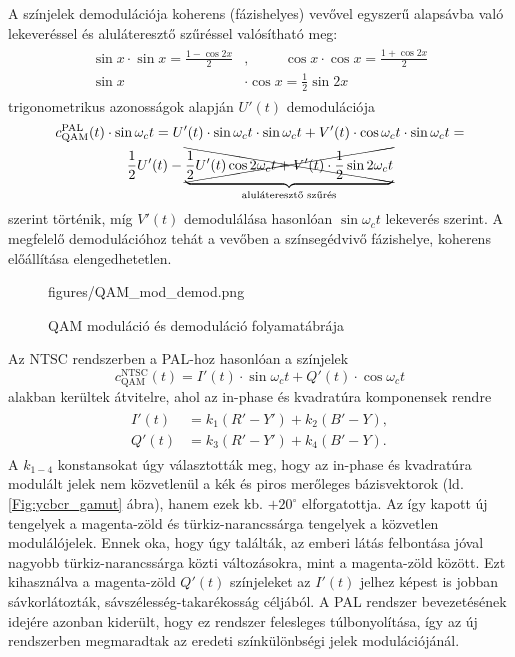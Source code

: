 A színjelek demodulációja koherens (fázishelyes) vevővel egyszerű alapsávba való lekeveréssel és aluláteresztő szűréssel valósítható meg:
\begin{align}
\begin{split}
\sin x \cdot \sin x = \frac{1-\cos 2x}{2}&,\hspace{1cm}
\cos x \cdot \cos x = \frac{1+\cos 2x}{2} \\
\sin x &\cdot \cos x = \frac{1}{2}\sin 2x
\end{split}
\end{align}
trigonometrikus azonosságok alapján $U'(t)$ demodulációja
\begin{multline}
c^{\mathrm{PAL}}_{\mathrm{QAM}}(t)\cdot \sin \omega_c t = U'(t)\cdot \sin \omega_c t\cdot \sin \omega_c t + V'(t) \cdot \cos \omega_c t  \cdot	\sin \omega_c t = \\
\frac{1}{2} U'(t) -
\underbrace{ \xcancel{ \frac{1}{2} U'(t)\cos 2 \omega_c t  + V'(t) \cdot \frac{1}{2}\sin 2 \omega_c t }}_{\text{aluláteresztő szűrés}}
\end{multline}
szerint történik, míg $V'(t)$ demodulálása hasonlóan $\sin \omega_c t$ lekeverés szerint.
A megfelelő demodulációhoz tehát a vevőben a színsegédvivő fázishelye, koherens előállítása elengedhetetlen.
\begin{figure}[]
	\centering
	\hspace{4mm}
	\begin{overpic}[width = 0.70\columnwidth ]{figures/QAM_mod_demod.png}
	\end{overpic}
	\caption{QAM moduláció és demoduláció folyamatábrája}
	\label{Fig:QAM_mod_demod}
\end{figure}

Az NTSC rendszerben a PAL-hoz hasonlóan a színjelek
\begin{equation}
c^{\mathrm{NTSC}}_{\mathrm{QAM}}(t) = I'(t) \cdot \sin \omega_c t + Q'(t) \cdot \cos \omega_c t
\end{equation}
alakban kerültek átvitelre, ahol az in-phase és kvadratúra komponensek rendre
\begin{align}
\begin{split}
I'(t) &= k_1 (R'-Y') + k_2 (B'-Y) ,\\ 
Q'(t) &= k_3 (R'-Y') + k_4 (B'-Y).
\end{split}
\end{align}
A $k_{1-4}$ konstansokat úgy választották meg, hogy az in-phase és kvadratúra modulált jelek nem közvetlenül a kék és piros merőleges bázisvektorok (ld. \ref{Fig:ycbcr_gamut} ábra), hanem ezek kb. $+20^{\circ}$ elforgatottja.
Az így kapott új tengelyek a magenta-zöld és türkiz-narancssárga tengelyek a közvetlen modulálójelek.
Ennek oka, hogy úgy találták, az emberi látás felbontása jóval nagyobb türkiz-narancssárga közti változásokra, mint a magenta-zöld között.
Ezt kihasználva a magenta-zöld $Q'(t)$ színjeleket az $I'(t)$ jelhez képest is jobban sávkorlátozták, sávszélesség-takarékosság céljából.
A PAL rendszer bevezetésének idejére azonban kiderült, hogy ez rendszer felesleges túlbonyolítása, így az új rendszerben megmaradtak az eredeti színkülönbségi jelek modulációjánál.


